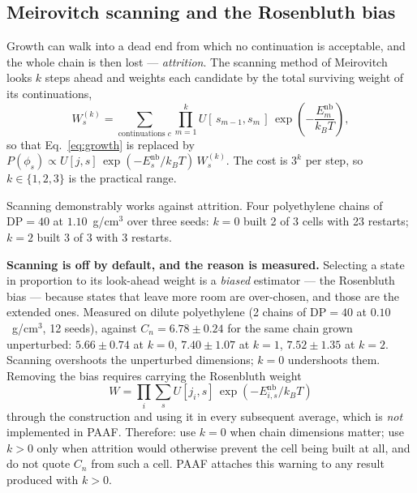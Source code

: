 \documentclass[11pt,a4paper]{article}
\begin{document}
\subsection{Meirovitch scanning and the Rosenbluth bias}

Growth can walk into a dead end from which no continuation is acceptable, and
the whole chain is then lost --- \emph{attrition}. The scanning method of
Meirovitch~\cite{meirovitch1983} looks $k$ steps ahead and weights each
candidate by the total surviving weight of its continuations,
\begin{equation}
  W_s^{(k)} = \sum_{\text{continuations } c}
  \prod_{m=1}^{k} U[\,s_{m-1}, s_m\,]\,
  \exp\!\left(-\frac{E^{\text{nb}}_{m}}{k_B T}\right),
  \label{eq:scan}
\end{equation}
so that Eq.~\eqref{eq:growth} is replaced by
$P(\phi_s) \propto U[j,s]\,\exp(-E^{\text{nb}}_s/k_BT)\,W_s^{(k)}$. The cost
is $3^{k}$ per step, so $k \in \{1,2,3\}$ is the practical range.

Scanning demonstrably works against attrition. Four polyethylene chains of
$\mathrm{DP}=40$ at $1.10$~g/cm$^3$ over three seeds: $k=0$ built 2 of 3 cells
with 23 restarts; $k=2$ built 3 of 3 with 3 restarts.

\begin{caveat}
\textbf{Scanning is off by default, and the reason is measured.}
Selecting a state in proportion to its look-ahead weight is a \emph{biased}
estimator --- the Rosenbluth bias --- because states that leave more room are
over-chosen, and those are the extended ones. Measured on dilute polyethylene
(2 chains of $\mathrm{DP}=40$ at $0.10$~g/cm$^3$, 12 seeds), against
$C_n = 6.78 \pm 0.24$ for the same chain grown unperturbed:
$5.66 \pm 0.74$ at $k=0$, $7.40 \pm 1.07$ at $k=1$, $7.52 \pm 1.35$ at $k=2$.
Scanning overshoots the unperturbed dimensions; $k=0$ undershoots them.
Removing the bias requires carrying the Rosenbluth weight
\begin{equation*}
  W = \prod_{i} \sum_{s} U[j_i,s]\,\exp(-E^{\text{nb}}_{i,s}/k_BT)
\end{equation*}
through the construction and using it in every subsequent average, which is
\emph{not} implemented in PAAF. Therefore: use $k=0$ when chain dimensions
matter; use $k>0$ only when attrition would otherwise prevent the cell being
built at all, and do not quote $C_n$ from such a cell. PAAF attaches this
warning to any result produced with $k>0$.
\end{caveat}
\end{document}
